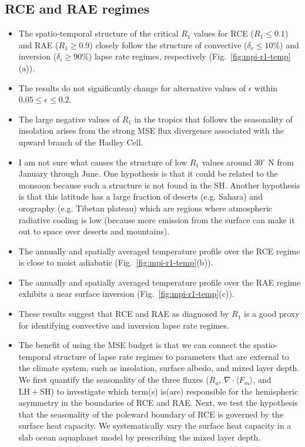 \documentclass{ametsocV5}
\begin{document}
\subsection{RCE and RAE regimes}
\begin{itemize}
  \item The spatio-temporal structure of the critical \(R_{1}\) values for RCE (\(R_{1}\le 0.1\)) and RAE (\(R_{1}\ge 0.9\)) closely follow the structure of convective (\(\delta_{c}\le 10\%\)) and inversion (\(\delta_{i}\ge 90\%\)) lapse rate regimes, respectively (Fig.~\ref{fig:mpi-r1-temp}(a)).
  \item The results do not significantly change for alternative values of \(\epsilon\) within \(0.05 \le \epsilon \le 0.2\).
  \item The large negative values of \(R_{1}\) in the tropics that follows the seasonality of insolation arises from the strong MSE flux divergence associated with the upward branch of the Hadley Cell.
  \item I am not sure what causes the structure of low \(R_{1}\) values around 30$^{\circ}$ N from January through June. One hypothesis is that it could be related to the monsoon because such a structure is not found in the SH. Another hypothesis is that this latitude has a large fraction of deserts (e.g. Sahara) and orography (e.g. Tibetan plateau) which are regions where atmospheric radiative cooling is low (because more emission from the surface can make it out to space over deserts and mountains).
  \item The annually and spatially averaged temperature profile over the RCE regime is close to moist adiabatic (Fig.~\ref{fig:mpi-r1-temp}(b)).
  \item The annually and spatially averaged temperature profile over the RAE regime exhibits a near surface inversion (Fig.~\ref{fig:mpi-r1-temp}(c)).
  \item These results suggest that RCE and RAE as diagnosed by \(R_{1}\) is a good proxy for identifying convective and inversion lapse rate regimes.
  \item The benefit of using the MSE budget is that we can connect the spatio-temporal structure of lapse rate regimes to parameters that are external to the climate system, such as insolation, surface albedo, and mixed layer depth. We first quantify the seasonality of the three fluxes (\(R_{a}\), \(\nabla\cdot\langle F_{m}\rangle\), and \(\mathrm{LH+SH}\)) to investigate which term(s) is(are) responsible for the hemispheric asymmetry in the boundaries of RCE and RAE. Next, we test the hypothesis that the seasonality of the poleward boundary of RCE is governed by the surface heat capacity. We systematically vary the surface heat capacity in a slab ocean aquaplanet model by prescribing the mixed layer depth.

\end{itemize}
\end{document}
